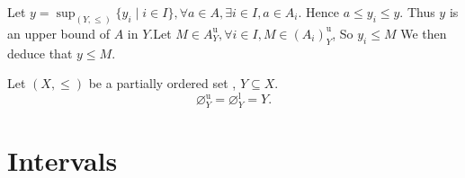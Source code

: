 \begin{proofenv}
    Let $y=\sup_{(Y, \le)}\{y_i\mid i\in I\}, \forall a\in A , \exists i\in I, a\in A_i$. Hence $a\le y_i\le y$. Thus $y $ is an upper bound of $A$ in $Y$.Let $M\in A_Y^\mathrm{u}, \forall i \in I, M\in (A_i)_Y^\mathrm{u}$,  So $y_i \le M $ We then deduce that $y\le M$.
\end{proofenv}
\begin{propositionenv}
    Let $(X, \le)$ be a partially ordered set , $Y\subseteq X$.$$\varnothing_Y^\mathrm{u}=\varnothing_Y^\mathrm{l}=Y.$$
\end{propositionenv}


\section{Intervals}

